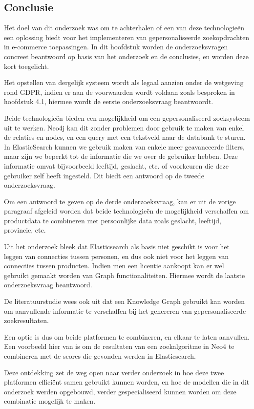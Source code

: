 \subsection{Conclusie}
\label{subsec:finalConclusie}

Het doel van dit onderzoek was om te achterhalen of een van deze technologieën een oplossing biedt voor het implementeren van gepersonaliseerde zoekopdrachten in e-commerce toepassingen. In dit hoofdstuk worden de onderzoeksvragen concreet beantwoord op basis van het onderzoek en de conclusies, en worden deze kort toegelicht.


Het opstellen van dergelijk systeem wordt als legaal aanzien onder de wetgeving rond GDPR, indien er aan de voorwaarden wordt voldaan zoals besproken in hoofdstuk 4.1, hiermee wordt de eerste onderzoeksvraag beantwoordt.
	
Beide technologieën bieden een mogelijkheid om een gepersonaliseerd zoeksysteem uit te werken. Neo4j kan dit zonder problemen  door gebruik te maken van enkel de relaties en nodes, en een query met een tekstveld naar de databank te sturen.
In ElasticSearch kunnen we gebruik maken van enkele meer geavanceerde filters, maar zijn we beperkt tot de informatie die we over de gebruiker hebben. Deze informatie omvat bijvoorbeeld leeftijd, geslacht, etc. of voorkeuren die deze gebruiker zelf heeft ingesteld. Dit biedt een antwoord op de tweede onderzoeksvraag.
	
Om een antwoord te geven op de derde onderzoeksvraag, kan er uit de vorige paragraaf afgeleid worden dat beide technologieën de mogelijkheid verschaffen om productdata te combineren met persoonlijke data zoals geslacht, leeftijd, provincie, etc. 

Uit het onderzoek bleek dat Elasticsearch als basis niet geschikt is voor het leggen van connecties tussen personen, en dus ook niet voor het leggen van connecties tussen producten. Indien men een licentie aankoopt kan er wel gebruikt gemaakt worden van Graph functionaliteiten. Hiermee wordt de laatste onderzoeksvraag beantwoord.

\newpage
De literatuurstudie wees ook uit dat een Knowledge Graph gebruikt kan worden om aanvullende informatie te verschaffen bij het genereren van gepersonaliseerde zoekresultaten. 

Een optie is dus om beide platformen te combineren, en elkaar te laten aanvullen. Een voorbeeld hier van is om de resultaten van een zoekalgoritme in Neo4 te combineren met de scores die gevonden werden in Elasticsearch. 

Deze ontdekking zet de weg open naar verder onderzoek in hoe deze twee platformen efficiënt samen gebruikt kunnen worden, en hoe de modellen die in dit onderzoek werden opgebouwd, verder gespecialiseerd kunnen worden om deze combinatie mogelijk te maken. 
